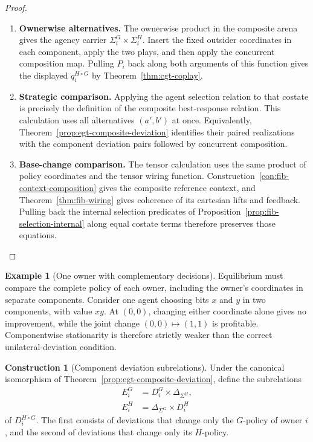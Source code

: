 \documentclass[11pt,a4paper]{article}
\numberwithin{equation}{section}
\theoremstyle{definition}
\newtheorem{example}[theorem]{Example}
\newtheorem{construction}[construction]{Construction}
\theoremstyle{remark}
\theoremstyle{plain}
\begin{document}
\begin{proof}
\leavevmode
\begin{enumerate}[label=\textup{(\arabic*)},leftmargin=*,itemsep=4pt,topsep=3pt]
  \item \textbf{Ownerwise alternatives.} The ownerwise product in the composite arena gives the agency carrier
$\Sigma_i^G\times\Sigma_i^H$. Insert the fixed outsider coordinates
in each component, apply the two plays, and then apply the concurrent
composition map. Pulling $P_i$ back along both arguments of this
function gives the displayed $q_i^{H\circ G}$ by
Theorem~\ref{thm:cgt-coplay}.
  \item \textbf{Strategic comparison.} Applying the agent selection relation
to that costate is precisely the definition of the composite
best-response relation. This calculation uses all alternatives
$(a',b')$ at once. Equivalently,
Theorem~\ref{prop:egt-composite-deviation} identifies their paired
realizations with the component deviation pairs followed by concurrent
composition.
  \item \textbf{Base-change comparison.} The tensor calculation uses the same product of policy
coordinates and the tensor wiring function. Construction~\ref{con:fib-context-composition} gives the composite
reference context, and Theorem~\ref{thm:fib-wiring} gives coherence of
its cartesian lifts and feedback. Pulling back the internal selection
predicates of Proposition~\ref{prop:fib-selection-internal} along equal
costate terms therefore preserves those equations.
\end{enumerate}
\end{proof}


\begin{example}[One owner with complementary decisions]
Equilibrium must compare the complete policy of each owner, including the owner's coordinates in separate components. Consider one agent
choosing bits $x$ and $y$ in two components, with value $xy$. At $(0,0)$,
changing either coordinate alone gives no improvement, while the joint
change $(0,0)\mapsto(1,1)$ is profitable. Componentwise stationarity is
therefore strictly weaker than the correct unilateral-deviation condition.
\end{example}

\begin{construction}[Component deviation subrelations]
Under the canonical isomorphism of
Theorem~\ref{prop:egt-composite-deviation}, define the subrelations
\begin{align*}
 E_i^G&=D_i^G\times\Delta_{\Sigma^H},\\
 E_i^H&=\Delta_{\Sigma^G}\times D_i^H
\end{align*}
of $D_i^{H\circ G}$. The first consists of deviations that change only the
$G$-policy of owner $i$, and the second of deviations that change only its
$H$-policy.
\end{construction}
\end{document}
